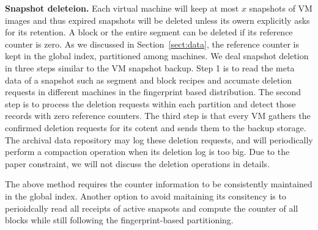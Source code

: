 {\bf Snapshot deleteion.} Each virtual machine will keep at most $x$ snapshots of VM images and thus
expired snapshots will be deleted unless its owern explicitly asks for its retention. 
A block or the entire segment can be deleted if its reference counter is zero.
As we discussed in Section~\ref{sect:data}, the reference counter is kept in the global index, partitioned among machines. 
We deal snapshot deletion in three steps similar to the VM snapshot backup.
Step 1 is to read  the meta data of a snapshot such as segment and block
recipes and  accumate  deletion requests in different machines  in the fingerprint based distribution.
The second step  is to process the deletion requests within each partition and detect those records with zero 
reference counters. The third step is that every VM gathers the confirmed deletion requests for its cotent and sends them
to the backup storage.
The archival data repository may log these deletion requests,  and will periodically perform a compaction operation when 
its deletion log is too big. 
Due to the paper constraint, we will not discuss the deletion operations in details.

The above method requires the counter information to be consistently maintained in the global index.
Another option to avoid maitaining its consitency is to perioidcally read all receipts of active 
snapsots and compute the counter of all blocks while still following the fingerprint-based partitioning. 



